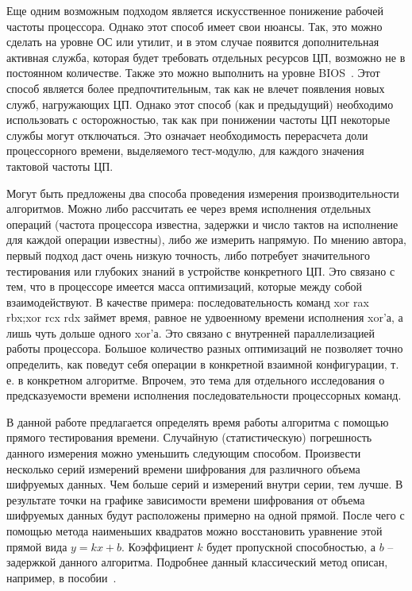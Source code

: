Еще одним возможным подходом является искусственное понижение рабочей частоты процессора. Однако этот способ имеет свои нюансы. Так, это можно сделать на уровне ОС или утилит, и в этом случае появится дополнительная активная служба, которая будет требовать отдельных ресурсов ЦП, возможно не в постоянном количестве. Также это можно выполнить на уровне BIOS~\cite{src63}. Этот способ является более предпочтительным, так как не влечет появления новых служб, нагружающих ЦП. Однако этот способ (как и предыдущий) необходимо использовать с осторожностью, так как при понижении частоты ЦП некоторые службы могут отключаться. Это означает необходимость перерасчета доли процессорного времени, выделяемого тест-модулю, для каждого значения тактовой частоты ЦП.

Могут быть предложены два способа проведения измерения производительности алгоритмов. Можно либо рассчитать ее через время исполнения отдельных операций (частота процессора известна, задержки и число тактов на исполнение для каждой операции известны), либо же измерить напрямую. По мнению автора, первый подход даст очень низкую точность, либо потребует значительного тестирования или глубоких знаний в устройстве конкретного ЦП. Это связано с тем, что в процессоре имеется масса оптимизаций, которые между собой взаимодействуют. В качестве примера: последовательность команд xor rax rbx;xor rcx rdx займет время, равное не удвоенному времени исполнения xor’а, а лишь чуть дольше одного xor’а. Это связано с внутренней параллелизацией работы процессора. Большое количество разных оптимизаций не позволяет точно определить, как поведут себя операции в конкретной взаимной конфигурации, т. е. в конкретном алгоритме. Впрочем, это тема для отдельного исследования о предсказуемости времени исполнения последовательности процессорных команд.

В данной работе предлагается определять время работы алгоритма с помощью прямого тестирования времени. Случайную (статистическую) погрешность данного измерения можно уменьшить следующим способом. Произвести несколько серий измерений времени шифрования для различного объема шифруемых данных. Чем больше серий и измерений внутри серии, тем лучше. В результате точки на графике зависимости времени шифрования от объема шифруемых данных будут расположены примерно на одной прямой. После чего с помощью метода наименьших квадратов можно восстановить уравнение этой прямой вида $y=kx+b$. Коэффициент $k$ будет пропускной способностью, а $b$ – задержкой данного алгоритма. Подробнее данный классический метод описан, например, в пособии~\cite{src64}.

